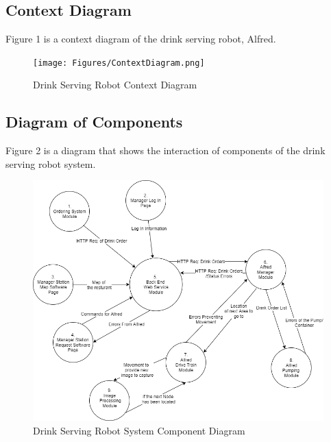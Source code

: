 \documentclass [10pt]{article}
\begin{document}

\subsection{Context Diagram}
Figure 1 is a context diagram of the drink serving robot, Alfred.
\begin{figure} [h!]
	\centering
	\texttt{[image: Figures/ContextDiagram.png]}
	\caption{Drink Serving Robot Context Diagram}
\end{figure}


\subsection{Diagram of Components}
Figure 2 is a diagram that shows the interaction of components of the drink serving robot system.
\begin{figure} [h!]
	\centering
	\includegraphics [scale = 0.6] {Figures/SystemComponents.png}
	\caption{Drink Serving Robot System Component Diagram}
\end{figure}

\end{document}
